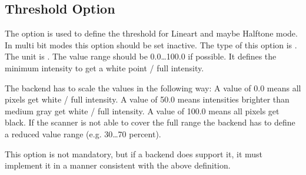 \documentclass[11pt,DVIps]{report}
\begin{document}
\begin{changebar}
\subsection{Threshold Option}
The option  is used to define the threshold
for Lineart and maybe Halftone mode. In multi bit modes
this option should be set inactive.
The type of this option is .
The unit is . The value range
should be 0.0\ldots100.0 if possible.
It defines the minimum intensity to get a white point / full intensity.

The backend has to scale the values in the following way:
A value of 0.0 means all pixels get white / full intensity.  A value of 50.0
means intensities brighter than medium gray get white / full intensity.  A
value of 100.0 means all pixels get black. If the
scanner is not able to cover the full range the backend has to define a
reduced value range (e.g. 30\ldots70 percent).

This option is not mandatory, but if a backend does support it, it
must implement it in a manner consistent with the above definition.
\end{changebar}
\end{document}
